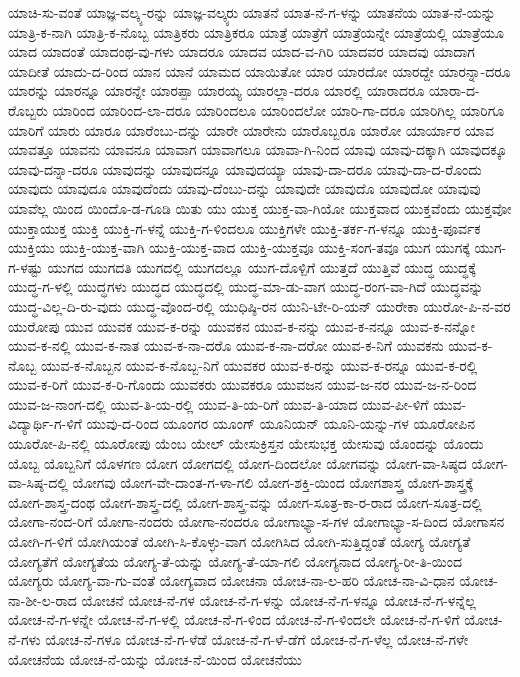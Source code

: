 {ಯಾಚಿ-ಸು-ವಂತೆ
ಯಾಜ್ಞ-ವಲ್ಕ್ಯ-ರನ್ನು
ಯಾಜ್ಞ-ವಲ್ಕ್ಯರು
ಯಾತನೆ
ಯಾತ-ನೆ-ಗ-ಳನ್ನು
ಯಾತನೆಯ
ಯಾತ-ನೆ-ಯನ್ನು
ಯಾತ್ರಿ-ಕ-ನಾಗಿ
ಯಾತ್ರಿ-ಕ-ನೊಬ್ಬ
ಯಾತ್ರಿಕರು
ಯಾತ್ರಿಕರೂ
ಯಾತ್ರೆ
ಯಾತ್ರೆಗೆ
ಯಾತ್ರೆಯನ್ನೇ
ಯಾತ್ರೆಯಲ್ಲಿ
ಯಾತ್ರೆಯೂ
ಯಾದ
ಯಾದಂತೆ
ಯಾದಂಥ-ವು-ಗಳು
ಯಾದರೂ
ಯಾದವ
ಯಾದ-ವ-ಗಿರಿ
ಯಾದವರ
ಯಾದವು
ಯಾದಾಗ
ಯಾದೀತೆ
ಯಾದು-ದ-ರಿಂದ
ಯಾನ
ಯಾನೆ
ಯಾಮದ
ಯಾಯಿತೋ
ಯಾರ
ಯಾರದೋ
ಯಾರದ್ದೇ
ಯಾರನ್ನಾ-ದರೂ
ಯಾರನ್ನು
ಯಾರನ್ನೂ
ಯಾರನ್ನೇ
ಯಾರಪ್ಪಾ
ಯಾರಯ್ಯ
ಯಾರಲ್ಲಾ-ದರೂ
ಯಾರಲ್ಲಿ
ಯಾರಾದರೂ
ಯಾರಾ-ದ-ರೊಬ್ಬರು
ಯಾರಿಂದ
ಯಾರಿಂದ-ಲಾ-ದರೂ
ಯಾರಿಂದಲೂ
ಯಾರಿಂದಲೋ
ಯಾರಿ-ಗಾ-ದರೂ
ಯಾರಿಗಿಲ್ಲ
ಯಾರಿಗೂ
ಯಾರಿಗೆ
ಯಾರು
ಯಾರೂ
ಯಾರೆಂಬು-ದನ್ನು
ಯಾರೇ
ಯಾರೇನು
ಯಾರೊಬ್ಬರೂ
ಯಾರೋ
ಯಾರ್ಯಾರ
ಯಾವ
ಯಾವತ್ತೂ
ಯಾವನು
ಯಾವನೂ
ಯಾವಾಗ
ಯಾವಾಗಲೂ
ಯಾವಾ-ಗಿ-ನಿಂದ
ಯಾವು
ಯಾವು-ದಕ್ಕಾಗಿ
ಯಾವುದಕ್ಕೂ
ಯಾವು-ದನ್ನಾ-ದರೂ
ಯಾವುದನ್ನು
ಯಾವುದನ್ನೂ
ಯಾವುದಯ್ಯಾ
ಯಾವು-ದಾ-ದರೂ
ಯಾವು-ದಾ-ದ-ರೊಂದು
ಯಾವುದು
ಯಾವುದೂ
ಯಾವುದೆಂದು
ಯಾವು-ದೆಂಬು-ದನ್ನು
ಯಾವುದೇ
ಯಾವುದೊ
ಯಾವುದೋ
ಯಾವುವು
ಯಾವೆಲ್ಲ
ಯಿಂದ
ಯಿಂದೊ-ಡ-ಗೂಡಿ
ಯಿತು
ಯು
ಯುಕ್ತ
ಯುಕ್ತ-ವಾ-ಗಿಯೋ
ಯುಕ್ತವಾದ
ಯುಕ್ತವೆಂದು
ಯುಕ್ತವೋ
ಯುಕ್ತಾಯುಕ್ತ
ಯುಕ್ತಿ
ಯುಕ್ತಿ-ಗ-ಳನ್ನೆ
ಯುಕ್ತಿ-ಗ-ಳಿಂದಲೂ
ಯುಕ್ತಿಗಳೇ
ಯುಕ್ತಿ-ತರ್ಕ-ಗ-ಳನ್ನೂ
ಯುಕ್ತಿ-ಪೂರ್ವಕ
ಯುಕ್ತಿಯು
ಯುಕ್ತಿ-ಯುಕ್ತ-ವಾಗಿ
ಯುಕ್ತಿ-ಯುಕ್ತ-ವಾದ
ಯುಕ್ತಿ-ಯುಕ್ತವೂ
ಯುಕ್ತಿ-ಸಂಗ-ತವೂ
ಯುಗ
ಯುಗಕ್ಕೆ
ಯುಗ-ಗ-ಳಷ್ಟು
ಯುಗದ
ಯುಗದತಿ
ಯುಗದಲ್ಲಿ
ಯುಗದಲ್ಲೂ
ಯುಗ-ದೊಳ್ಪಿಗೆ
ಯುತ್ತದೆ
ಯುತ್ತಿವೆ
ಯುದ್ಧ
ಯುದ್ಧಕ್ಕೆ
ಯುದ್ಧ-ಗ-ಳಲ್ಲಿ
ಯುದ್ಧಗಳು
ಯುದ್ಧದ
ಯುದ್ಧದಲ್ಲಿ
ಯುದ್ಧ-ಮಾ-ಡು-ವಾಗ
ಯುದ್ಧ-ರಂಗ-ವಾ-ಗಿದೆ
ಯುದ್ಧವನ್ನು
ಯುದ್ಧ-ವಿಲ್ಲ-ದಿ-ರು-ವುದು
ಯುದ್ಧ-ವೊಂದ-ರಲ್ಲಿ
ಯುಧಿಷ್ಠಿ-ರನ
ಯುನಿ-ಟೇ-ರಿ-ಯನ್
ಯುರೇಕಾ
ಯುರೋ-ಪಿ-ನ-ವರ
ಯುರೋಪು
ಯುವ
ಯುವಕ
ಯುವ-ಕ-ರನ್ನು
ಯುವಕನ
ಯುವ-ಕ-ನನ್ನು
ಯುವ-ಕ-ನನ್ನೂ
ಯುವ-ಕ-ನನ್ನೋ
ಯುವ-ಕ-ನಲ್ಲಿ
ಯುವ-ಕ-ನಾತ
ಯುವ-ಕ-ನಾ-ದರೊ
ಯುವ-ಕ-ನಾ-ದರೋ
ಯುವ-ಕ-ನಿಗೆ
ಯುವಕನು
ಯುವ-ಕ-ನೊಬ್ಬ
ಯುವ-ಕ-ನೊಬ್ಬನ
ಯುವ-ಕ-ನೊಬ್ಬ-ನಿಗೆ
ಯುವಕರ
ಯುವ-ಕ-ರನ್ನು
ಯುವ-ಕ-ರನ್ನೂ
ಯುವ-ಕ-ರಲ್ಲಿ
ಯುವ-ಕ-ರಿಗೆ
ಯುವ-ಕ-ರಿ-ಗೊಂದು
ಯುವಕರು
ಯುವಕರೂ
ಯುವಜನ
ಯುವ-ಜ-ನರ
ಯುವ-ಜ-ನ-ರಿಂದ
ಯುವ-ಜ-ನಾಂಗ-ದಲ್ಲಿ
ಯುವ-ತಿ-ಯ-ರಲ್ಲಿ
ಯುವ-ತಿ-ಯ-ರಿಗೆ
ಯುವ-ತಿ-ಯಾದ
ಯುವ-ಪೀ-ಳಿಗೆ
ಯುವ-ವಿದ್ಯಾರ್ಥಿ-ಗ-ಳಿಗೆ
ಯುವು-ದ-ರಿಂದ
ಯೂಂಗರ
ಯೂಂಗ್
ಯೂನಿಯನ್
ಯೂನಿ-ಯನ್ನು-ಗಳ
ಯೂರೋಪಿನ
ಯೂರೋ-ಪಿ-ನಲ್ಲಿ
ಯೂರೋಪು
ಯೆಂಬ
ಯೇಲ್
ಯೇಸುಕ್ರಿಸ್ತನ
ಯೇಸುಭಕ್ತ
ಯೇಸುವು
ಯೊಂದನ್ನು
ಯೊಂದು
ಯೊಬ್ಬ
ಯೊಬ್ಬನಿಗೆ
ಯೊಳಗಣ
ಯೋಗ
ಯೋಗದಲ್ಲಿ
ಯೋಗ-ದಿಂದಲೋ
ಯೋಗವನ್ನು
ಯೋಗ-ವಾ-ಸಿಷ್ಠದ
ಯೋಗ-ವಾ-ಸಿಷ್ಠ-ದಲ್ಲಿ
ಯೋಗವು
ಯೋಗ-ವೇ-ದಾಂತ-ಗ-ಳಾ-ಗಲಿ
ಯೋಗ-ಶಕ್ತಿ-ಯಿಂದ
ಯೋಗಶಾಸ್ತ್ರ
ಯೋಗ-ಶಾಸ್ತ್ರಕ್ಕೆ
ಯೋಗ-ಶಾಸ್ತ್ರ-ದಂಥ
ಯೋಗ-ಶಾಸ್ತ್ರ-ದಲ್ಲಿ
ಯೋಗ-ಶಾಸ್ತ್ರ-ವನ್ನು
ಯೋಗ-ಸೂತ್ರ-ಕಾ-ರ-ರಾದ
ಯೋಗ-ಸೂತ್ರ-ದಲ್ಲಿ
ಯೋಗಾ-ನಂದ-ರಿಗೆ
ಯೋಗಾ-ನಂದರು
ಯೋಗಾ-ನಂದರೂ
ಯೋಗಾಭ್ಯಾ-ಸ-ಗಳ
ಯೋಗಾಭ್ಯಾ-ಸ-ದಿಂದ
ಯೋಗಾಸನ
ಯೋಗಿ-ಗ-ಳಿಗೆ
ಯೋಗಿಯಂತೆ
ಯೋಗಿ-ಸಿ-ಕೊಳ್ಳು-ವಾಗ
ಯೋಗಿಸಿದ
ಯೋಗಿ-ಸುತ್ತಿದ್ದಂತೆ
ಯೋಗ್ಯ
ಯೋಗ್ಯತೆ
ಯೋಗ್ಯತೆಗೆ
ಯೋಗ್ಯತೆಯ
ಯೋಗ್ಯ-ತೆ-ಯನ್ನು
ಯೋಗ್ಯ-ತೆ-ಯಾ-ಗಲಿ
ಯೋಗ್ಯನಾದ
ಯೋಗ್ಯ-ರೀ-ತಿ-ಯಿಂದ
ಯೋಗ್ಯರು
ಯೋಗ್ಯ-ವಾ-ಗು-ವಂತೆ
ಯೋಗ್ಯವಾದ
ಯೋಚನಾ
ಯೋಚ-ನಾ-ಲ-ಹರಿ
ಯೋಚ-ನಾ-ವಿ-ಧಾನ
ಯೋಚ-ನಾ-ಶೀ-ಲ-ರಾದ
ಯೋಚನೆ
ಯೋಚ-ನೆ-ಗಳ
ಯೋಚ-ನೆ-ಗ-ಳನ್ನು
ಯೋಚ-ನೆ-ಗ-ಳನ್ನೂ
ಯೋಚ-ನೆ-ಗ-ಳನ್ನೆಲ್ಲ
ಯೋಚ-ನೆ-ಗ-ಳನ್ನೇ
ಯೋಚ-ನೆ-ಗ-ಳಲ್ಲಿ
ಯೋಚ-ನೆ-ಗ-ಳಿಂದ
ಯೋಚ-ನೆ-ಗ-ಳಿಂದಲೇ
ಯೋಚ-ನೆ-ಗ-ಳಿಗೆ
ಯೋಚ-ನೆ-ಗಳು
ಯೋಚ-ನೆ-ಗಳೂ
ಯೋಚ-ನೆ-ಗ-ಳೆಡೆ
ಯೋಚ-ನೆ-ಗ-ಳೆ-ಡೆಗೆ
ಯೋಚ-ನೆ-ಗ-ಳೆಲ್ಲ
ಯೋಚ-ನೆ-ಗಳೇ
ಯೋಚನೆಯ
ಯೋಚ-ನೆ-ಯನ್ನು
ಯೋಚ-ನೆ-ಯಿಂದ
ಯೋಚನೆಯು
}

